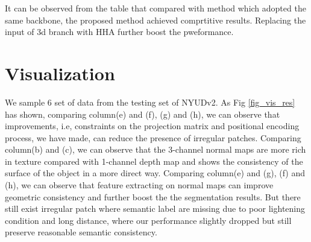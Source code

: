 ﻿\documentclass[journal]{IEEEtran}
\begin{document}
    It can be observed from the table that compared with method which adopted the same backbone, the proposed method achieved comprtitive results. Replacing the input of 3d branch with HHA further boost the pweformance.
    

    \section{Visualization}
    We sample 6 set of data from the testing set of NYUDv2. As Fig \ref{fig_vis_res}
    has shown, comparing column(e) and (f), (g) and (h), we can observe that improvements, i.e, constraints on the projection matrix and positional
    encoding process, we have made, can reduce the presence of irregular patches. Comparing column(b) and (c), we can observe that the 3-channel normal maps are more rich in texture compared with 1-channel depth map and shows the consistency of the surface of the object in a more direct way. Comparing column(e) and (g), (f) and (h), we can observe that feature extracting on normal maps can improve geometric consistency and further boost the the segmentation results. But there still exist irregular patch where semantic label are missing due to poor lightening condition and long distance, where our performance slightly dropped but still preserve reasonable semantic consistency.
\end{document}
